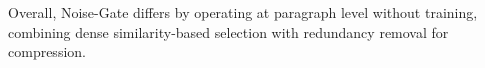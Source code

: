 \documentclass[runningheads]{llncs}
\begin{document}
Overall, Noise-Gate differs by operating at paragraph level without training, combining dense similarity-based selection with redundancy removal for compression.





\end{document}
